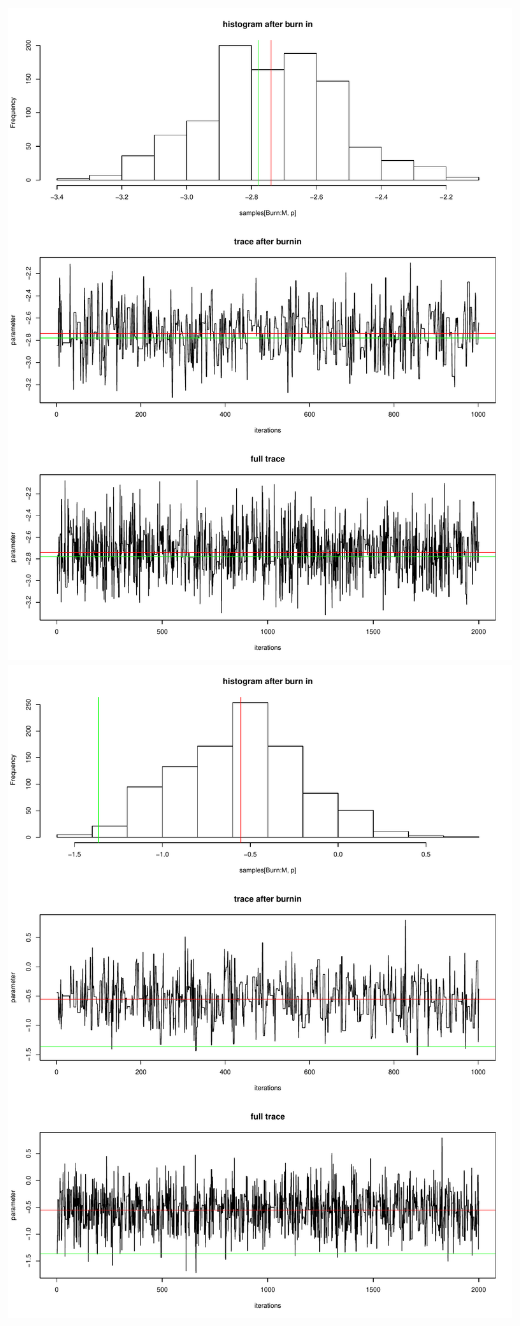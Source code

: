 \documentclass[a4paper,12pt]{scrartcl} %
\begin{document}
\includegraphics[scale=0.4]{19}
\includegraphics[scale=0.4]{20}
%
%
%
%
%
\clearpage
\end{document}
